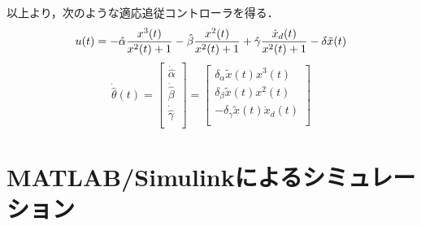 \documentclass[a4paper,12pt]{jarticle}
\begin{document}
以上より，次のような適応追従コントローラを得る．
\begin{equation}
  u(t) = - \hat{\alpha}\dfrac{x^3(t)}{x^2(t) + 1} - \hat{\beta}\dfrac{x^2(t)}{x^2(t) + 1} +\hat{\gamma}\dfrac{\dot{x}_d(t)}{x^2(t) + 1} - \delta \tilde{x}(t)\\
\end{equation}
\begin{equation}
  \dot{\hat{\theta}}(t) = \left[
			  \begin{array}{c}
			   \dot{\hat{\alpha}} \\
			   \dot{\hat{\beta}} \\
			   \dot{\hat{\gamma}} \\
			  \end{array}
			 \right] = \left[
				   \begin{array}{c}
				    \delta_{\alpha}\tilde{x}(t)x^3(t) \\
				    \delta_{\beta}\tilde{x}(t)x^2(t) \\
				    - \delta_{\gamma}\tilde{x}(t)\dot{x}_d(t) \\
				   \end{array}\right]
\end{equation}
\section{MATLAB/Simulinkによるシミュレーション}
\end{document}

